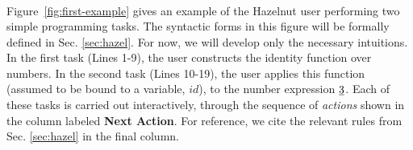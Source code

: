\begin{figure*}[t!]
\[\begin{array}{|c||c|c||l|l|}
\end{array}
\]
\caption{Constructing an identity function in Hazelnut (Lines~1--9), then  applying this function (assumed bound to $id$, not shown) to an argument~(Lines 10--19). The formal syntax and referenced rules in the final column are described in Section \ref{sec:hazel}.}
\label{fig:first-example}
\end{figure*}
%
Figure~\ref{fig:first-example} gives an example of the Hazelnut user
performing two simple programming tasks.
The syntactic forms in this figure will be formally defined in Sec. \ref{sec:hazel}. For now, we will develop only the necessary intuitions. In the first task (Lines 1-9), the user constructs the identity function over numbers. In the second task (Lines 10-19), the user applies this function (assumed to be bound to a variable, $id$), to the number expression $\underline{3}$.
Each of these tasks is carried out interactively, through the sequence of \emph{actions} shown in the  column labeled \textbf{Next Action}. For reference, we cite the relevant rules from Sec. \ref{sec:hazel} in the final column.

